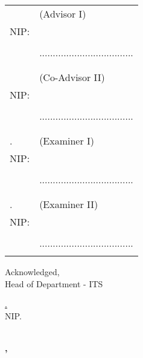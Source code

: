 \noindent
\begin{tabularx}{\textwidth}{X l}
  \advisor{}              & (Advisor I)                         \\
  NIP: \advisornip{}      &                                     \\
                          &                                     \\
                          & ................................... \\
                          &                                     \\
                          &                                     \\
  \coadvisor{}            & (Co-Advisor II)                     \\
  NIP: \coadvisornip{}    &                                     \\
                          &                                     \\
                          & ................................... \\
                          &                                     \\
                          &                                     \\
  \examinerone{}.         & (Examiner I)                        \\
  NIP: \examineronenip{}  &                                     \\
                          &                                     \\
                          & ................................... \\
                          &                                     \\
                          &                                     \\
  \examinertwo{}.         & (Examiner II)                       \\
  NIP: \examinertwonip{}  &                                     \\
                          &                                     \\
                          & ................................... \\
                          &                                     \\
\end{tabularx}
\endgroup


\begin{center}
  Acknowledged, \\
  Head of \engdepartment{} Department \engfacultyshort{} - ITS \\

  \vspace{8ex}

  \underline{\headofdepartment{}.} \\
  NIP. \headofdepartmentnip{}
\end{center}

\begin{center}
  \textbf{\MakeUppercase{\place{}}\\\ENGMONTH{}, \the\year{}}
\end{center}
\endgroup
